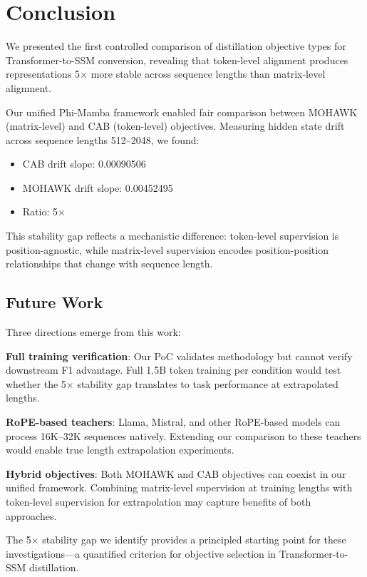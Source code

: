 \section{Conclusion}

We presented the first controlled comparison of distillation objective types for Transformer-to-SSM conversion, revealing that token-level alignment produces representations 5$\times$ more stable across sequence lengths than matrix-level alignment.

Our unified Phi-Mamba framework enabled fair comparison between MOHAWK (matrix-level) and CAB (token-level) objectives. Measuring hidden state drift across sequence lengths 512--2048, we found:

\begin{itemize}
    \item CAB drift slope: 0.00090506
    \item MOHAWK drift slope: 0.00452495
    \item Ratio: 5$\times$
\end{itemize}

This stability gap reflects a mechanistic difference: token-level supervision is position-agnostic, while matrix-level supervision encodes position-position relationships that change with sequence length.

\subsection{Future Work}

Three directions emerge from this work:

\textbf{Full training verification}: Our PoC validates methodology but cannot verify downstream F1 advantage. Full 1.5B token training per condition would test whether the 5$\times$ stability gap translates to task performance at extrapolated lengths.

\textbf{RoPE-based teachers}: Llama, Mistral, and other RoPE-based models can process 16K--32K sequences natively. Extending our comparison to these teachers would enable true length extrapolation experiments.

\textbf{Hybrid objectives}: Both MOHAWK and CAB objectives can coexist in our unified framework. Combining matrix-level supervision at training lengths with token-level supervision for extrapolation may capture benefits of both approaches.

The 5$\times$ stability gap we identify provides a principled starting point for these investigations---a quantified criterion for objective selection in Transformer-to-SSM distillation.
